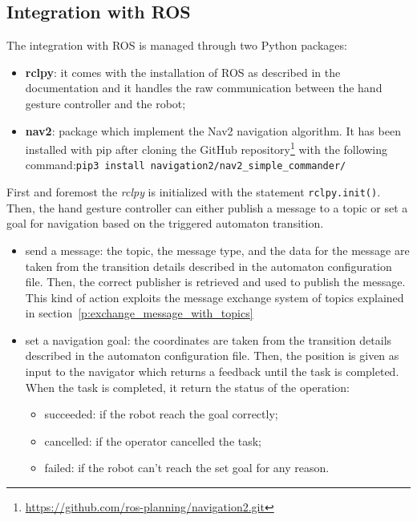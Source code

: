 \documentclass[../thesis.tex]{subfiles}
\begin{document}
\subsection{Integration with ROS}
The integration with \acrshort{ROS} is managed through two Python packages:
\begin{itemize}
    \item \textbf{rclpy}: it comes with the installation of \acrshort{ROS} as described in the documentation and it handles the raw communication between the hand gesture controller and the robot;
    \item \textbf{nav2}: package which implement the Nav2 navigation algorithm. It has been installed with pip after cloning the GitHub repository\footnote{\href{https://github.com/ros-planning/navigation2.git}{https://github.com/ros-planning/navigation2.git}} with the following command:\newline\texttt{pip3 install navigation2/nav2\_simple\_commander/}
\end{itemize}
First and foremost the \textit{rclpy} is initialized with the statement \texttt{rclpy.init()}. Then, the hand gesture controller can either publish a message to a topic or set a goal for navigation based on the triggered automaton transition.
\begin{itemize}
    \item send a message: the topic, the message type, and the data for the message are taken from the transition details described in the automaton configuration file. Then, the correct publisher is retrieved and used to publish the message. This kind of action exploits the message exchange system of topics explained in section~\ref{p:exchange_message_with_topics}
    \item set a navigation goal: the coordinates are taken from the transition details described in the automaton configuration file. Then, the position is given as input to the navigator which returns a feedback until the task is completed. When the task is completed, it return the status of the operation:
    \begin{itemize}
        \item succeeded: if the robot reach the goal correctly;
        \item cancelled: if the operator cancelled the task;
        \item failed: if the robot can't reach the set goal for any reason.
    \end{itemize}
\end{itemize}
\end{document}
